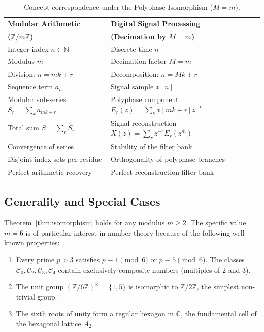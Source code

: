 \documentclass{article}
\theoremstyle{plain}
\theoremstyle{definition}
\theoremstyle{remark}
\begin{document}
\begin{table}[H]
\caption{Concept correspondence under the Polyphase Isomorphism (\(M=m\)).}
\label{tab:isomorphism}
\centering
\begin{tabular}{p{6.5cm} p{8.5cm}}
\toprule
\textbf{Modular Arithmetic} & \textbf{Digital Signal Processing} \\
\textbf{(\(\mathbb{Z}/m\mathbb{Z}\))} & \textbf{(Decimation by \(M=m\))} \\
\midrule
Integer index \(n \in \mathbb{N}\) & Discrete time \(n\) \\
\addlinespace
Modulus \(m\) & Decimation factor \(M=m\) \\
\addlinespace
Division: \(n = mk + r\) & Decomposition: \(n = M k + r\) \\
\addlinespace
Sequence term \(a_n\) & Signal sample \(x[n]\) \\
\addlinespace
Modular sub-series \(S_r = \sum_k a_{mk+r}\) & Polyphase component \(E_r(z) = \sum_k x[mk+r] z^{-k}\) \\
\addlinespace
Total sum \(S = \sum_{r} S_r\) & Signal reconstruction \(X(z) = \sum_r z^{-r} E_r(z^m)\) \\
\addlinespace
Convergence of series & Stability of the filter bank \\
\addlinespace
Disjoint index sets per residue & Orthogonality of polyphase branches \\
\addlinespace
Perfect arithmetic recovery & Perfect reconstruction filter bank \\
\bottomrule
\end{tabular}
\end{table}

\subsection{Generality and Special Cases}
Theorem~\ref{thm:isomorphism} holds for any modulus \(m \ge 2\). The specific value \(m=6\) is of particular interest in number theory because of the following well-known properties:

\begin{enumerate}[label=(\roman*)]
    \item Every prime \(p > 3\) satisfies \(p \equiv 1 \pmod{6}\) or \(p \equiv 5 \pmod{6}\). The classes \(\mathcal{C}_0, \mathcal{C}_2, \mathcal{C}_3, \mathcal{C}_4\) contain exclusively composite numbers (multiples of 2 and 3).
    \item The unit group \((\mathbb{Z}/6\mathbb{Z})^{\times} = \{1,5\}\) is isomorphic to \(\mathbb{Z}/2\mathbb{Z}\), the simplest non-trivial group.
    \item The sixth roots of unity form a regular hexagon in \(\mathbb{C}\), the fundamental cell of the hexagonal lattice \(A_2\) \cite{conway1999sphere}.
\end{enumerate}
\end{document}

